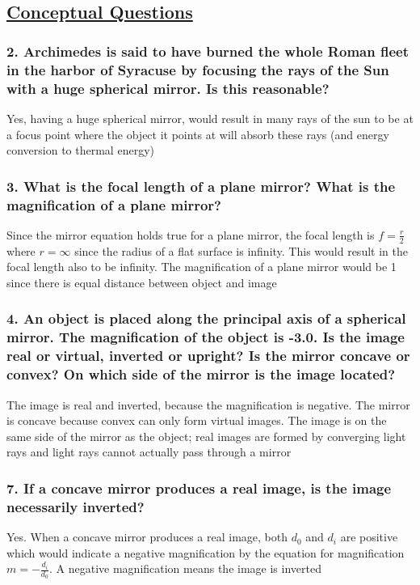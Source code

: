 \documentclass{article}
\title{
    \vspace{2in}
    \textmd{\textbf{\hmwkTitle}}\\
    \vspace{0.5in}
    \textmd{\textbf{\hmwkClass}}\\
    \vspace{4in}
}
\author{\hmwkAuthorName}
\date{}
\begin{document}
\maketitle
\newpage
\begin{center}
    \section*{\textbf{\underline {Conceptual Questions}}}
\end{center}
\subsubsection*{
    2. Archimedes is said to have burned the whole Roman fleet in the harbor
    of Syracuse by focusing the rays of the Sun with a huge spherical mirror.
    Is this reasonable?
}
Yes, having a huge spherical mirror, would result in many rays of the sun to be
at a focus point where the object it points at will absorb these rays (and
energy conversion to thermal energy)
\subsubsection*{
    3. What is the focal length of a plane mirror? What is the magnification
    of a plane mirror?
}
Since the mirror equation holds true for a plane mirror, the focal length is
$f=\frac r 2$ where $r=\infty$ since the radius of a flat surface is infinity. This
would result in the focal length also to be infinity. The magnification of a
plane mirror would be 1 since there is equal distance between object and image 
\subsubsection*{
    4. An object is placed along the principal axis of a spherical mirror.
    The magnification of the object is -3.0. Is the image real or virtual,
    inverted or upright? Is the mirror concave or convex? On which side of
    the mirror is the image located?
}
The image is real and inverted, because the magnification is negative. The
mirror is concave because convex can only form virtual images. The image is on
the same side of the mirror as the object; real images are formed by converging
light rays and light rays cannot actually pass through a mirror
\subsubsection*{
    7. If a concave mirror produces a real image, is the image necessarily
    inverted?
}
Yes. When a concave mirror produces a real image, both $d_0$ and $d_i$ are
positive which would indicate a negative magnification by the equation for
magnification $m=-\displaystyle\frac{d_i}{d_0}$. A negative magnification means the image is
inverted 
\end{document}
